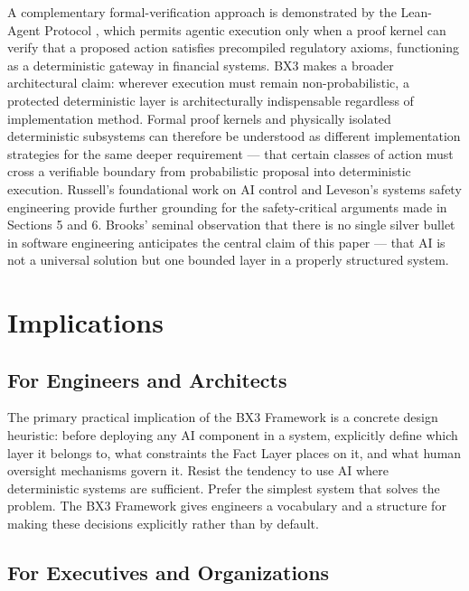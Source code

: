 \documentclass[12pt]{article}
\begin{document}
A complementary formal-verification approach is demonstrated by the Lean-Agent Protocol \cite{rashie2026}, which permits agentic execution only when a proof kernel can verify that a proposed action satisfies precompiled regulatory axioms, functioning as a deterministic gateway in financial systems. BX3 makes a broader architectural claim: wherever execution must remain non-probabilistic, a protected deterministic layer is architecturally indispensable regardless of implementation method. Formal proof kernels and physically isolated deterministic subsystems can therefore be understood as different implementation strategies for the same deeper requirement --- that certain classes of action must cross a verifiable boundary from probabilistic proposal into deterministic execution. Russell's foundational work on AI control \cite{russell2019} and Leveson's systems safety engineering \cite{leveson2011} provide further grounding for the safety-critical arguments made in Sections 5 and 6. Brooks' seminal observation that there is no single silver bullet in software engineering \cite{brooks1987} anticipates the central claim of this paper --- that AI is not a universal solution but one bounded layer in a properly structured system.

\section{Implications}
\label{sec:implications}

\subsection{For Engineers and Architects}

The primary practical implication of the BX3 Framework is a concrete design heuristic: before deploying any AI component in a system, explicitly define which layer it belongs to, what constraints the Fact Layer places on it, and what human oversight mechanisms govern it. Resist the tendency to use AI where deterministic systems are sufficient. Prefer the simplest system that solves the problem. The BX3 Framework gives engineers a vocabulary and a structure for making these decisions explicitly rather than by default.

\subsection{For Executives and Organizations}
\end{document}
